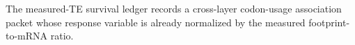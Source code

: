 The measured-TE survival ledger records a cross-layer codon-usage association packet whose response variable is already normalized by the measured footprint-to-mRNA ratio.

